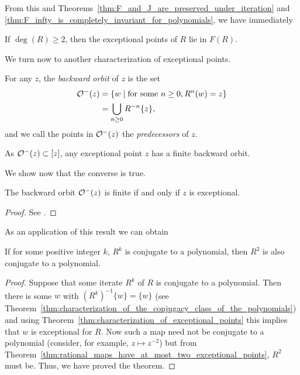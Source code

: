 From this and Theorems~\ref{thm:F_and_J_are_preserved_under_iteration} and
\ref{thm:F_infty_is_completely_invariant_for_polynomials}, we have immediately

\begin{corollary}
    If $\deg(R) \geq 2$, then the exceptional points of $R$ lie in $F(R)$.
\end{corollary}

We turn now to another characterization of exceptional points.

\begin{definition}
    For any $z$, the \emph{backward orbit} of $z$ is the set
    \begin{align*}
        \mathcal{O}^-(z) &= \{w \mid \text{for some } n \geq 0, R^n(w) = z\} \\
                    &= \bigcup_{n \geq 0} R^{-n}\{z\},
    \end{align*}
    and we call the points in $\mathcal{O}^-(z)$ the \emph{predecessors} of $z$.
\end{definition}

\begin{remark}
    As $\mathcal{O}^-(z) \subset [z]$, any exceptional point $z$ has a finite
    backward orbit.
\end{remark}

We show now that the converse is true.

\begin{theorem}
    \label{thm:characterization_of_exceptional_points}
    The backward orbit $\mathcal{O}^-(z)$ is finite if and only if $z$ is
    exceptional.
\end{theorem}
\begin{proof}
    See \cite[66]{Beardon1991}.
\end{proof}

As an application of this result we can obtain

\begin{theorem}
    If for some positive integer $k$, $R^k$ is conjugate to a polynomial, then
    $R^2$ is also conjugate to a polynomial.
\end{theorem}
\begin{proof}
    Suppose that some iterate $R^k$ of $R$ is conjugate to a polynomial. Then
    there is some $w$ with $\left(R^k\right)^{-1}\{w\} = \{w\}$ (see
    Theorem~\ref{thm:characterization_of_the_conjugacy_class_of_the_polynomials})
    and using Theorem~\ref{thm:characterization_of_exceptional_points} this
    implies that $w$ is exceptional for $R$. Now such a map need not be
    conjugate to a polynomial (consider, for example, $z \mapsto z^{-2}$) but
    from Theorem~\ref{thm:rational_maps_have_at_most_two_exceptional_points},
    $R^2$ must be. Thus, we have proved the theorem.
\end{proof}

